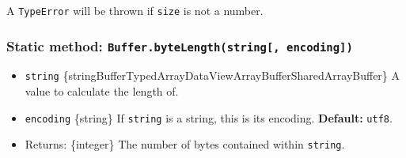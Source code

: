 \begin{Shaded}
\begin{Highlighting}[]
\NormalTok{ \{ }\NormalTok{ \} }\OperatorTok{=} \NormalTok{(}\NormalTok{)}\OperatorTok{;}

\OperatorTok{=}\NormalTok{ []}\OperatorTok{;}

\NormalTok{(}\OperatorTok{,}\NormalTok{ () }\KeywordTok{=\textgreater{}}\NormalTok{ \{}
  \OperatorTok{;}
  \NormalTok{ (} \OperatorTok{!==}\OperatorTok{=}\NormalTok{())) \{}
    \OperatorTok{=} \NormalTok{(}\NormalTok{)}\OperatorTok{;}

\OperatorTok{,} \OperatorTok{,} \OperatorTok{,} \NormalTok{)}\OperatorTok{;}

\OperatorTok{;}
\NormalTok{  \}}
\NormalTok{\})}\OperatorTok{;}
\end{Highlighting}
\end{Shaded}

A \texttt{TypeError} will be thrown if \texttt{size} is not a number.

\subsubsection{\texorpdfstring{Static method:
\texttt{Buffer.byteLength(string{[},\ encoding{]})}}{Static method: Buffer.byteLength(string{[}, encoding{]})}}\label{static-method-buffer.bytelengthstring-encoding}

\begin{itemize}
\tightlist
\item
  \texttt{string}
  \{string\textbar Buffer\textbar TypedArray\textbar DataView\textbar ArrayBuffer\textbar SharedArrayBuffer\}
  A value to calculate the length of.
\item
  \texttt{encoding} \{string\} If \texttt{string} is a string, this is
  its encoding. \textbf{Default:}
  \texttt{\textquotesingle{}utf8\textquotesingle{}}.
\item
  Returns: \{integer\} The number of bytes contained within
  \texttt{string}.
\end{itemize}

